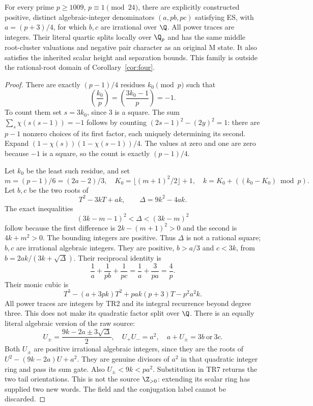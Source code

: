 \begin{theorem}
\label{thm:algebraic}
For every prime $p\ge1009$, $p\equiv1\pmod{24}$, there are explicitly constructed
positive, distinct algebraic-integer denominators $(a,pb,pc)$ satisfying ES,
with $a=(p+3)/4$, for which $b,c$ are irrational over $\Q$. All power traces
are integers. Their literal quartic splits locally over $\Q_p$ and has the
same middle root-cluster valuations and negative pair character as an original
M state. It also satisfies the inherited scalar height and separation bounds.
This family is outside the rational-root domain of Corollary~\ref{cor:four}.
\end{theorem}
\begin{proof}
There are exactly $(p-1)/4$ residues $k_0\pmod p$ such that
\[
 \left(\frac{k_0}{p}\right)=
 \left(\frac{3k_0-1}{p}\right)=-1.                     \tag{TR21}
\]
To count them set $s=3k_0$, since $3$ is a square. The sum
$\sum_s\chi(s(s-1))=-1$ follows by counting
$(2s-1)^2-(2y)^2=1$: there are $p-1$ nonzero choices of its first factor,
each uniquely determining its second. Expand
$(1-\chi(s))(1-\chi(s-1))/4$. The values at zero and one are zero because
$-1$ is a square, so the count is exactly $(p-1)/4$.

Let $k_0$ be the least such residue, and set
\[
 m=(p-1)/6=(2a-2)/3,\quad
 K_0=\lfloor(m+1)^2/2\rfloor+1,\quad
 k=K_0+((k_0-K_0)\bmod p).
\]
Let $b,c$ be the two roots of
\[
 T^2-3kT+ak,
 \qquad \Delta=9k^2-4ak.                               \tag{TR22}
\]
The exact inequalities
\[
 \boxed{(3k-m-1)^2<\Delta<(3k-m)^2}                    \tag{TR23}
\]
follow because the first difference is $2k-(m+1)^2>0$ and the second is
$4k+m^2>0$. The bounding integers are positive. Thus $\Delta$ is not a rational
square; $b,c$ are irrational algebraic integers. They are positive,
$b>a/3$ and $c<3k$, from $b=2ak/(3k+\sqrt\Delta)$.
Their reciprocal identity is
\[
 \frac1a+\frac1{pb}+\frac1{pc}
 =\frac1a+\frac3{pa}=\frac4p.
\]
Their monic cubic is
\[
 T^3-(a+3pk)T^2+pa k(p+3)T-p^2a^2k.                   \tag{TR24}
\]
All power traces are integers by TR2 and its integral recurrence beyond degree
three. This does not make its quadratic factor split over $\Q$.
There is an equally literal algebraic version of the raw source:
\[
 U_\pm=\frac{9k-2a\pm3\sqrt\Delta}{2},\quad
 U_+U_-=a^2,\quad a+U_\pm=3b\ \text{or}\ 3c.            \tag{TR25}
\]
Both $U_\pm$ are positive irrational algebraic integers, since they are the roots
of $U^2-(9k-2a)U+a^2$. They are genuine divisors of $a^2$ in that quadratic
integer ring and pass its sum gate. Also
$U_\pm<9k<p a^2$. Substitution in TR7 returns the two tail orientations.
This is not the source $\Z_{>0}$: extending its scalar ring has supplied two
new words. The field and the conjugation label cannot be discarded.


\end{proof}
